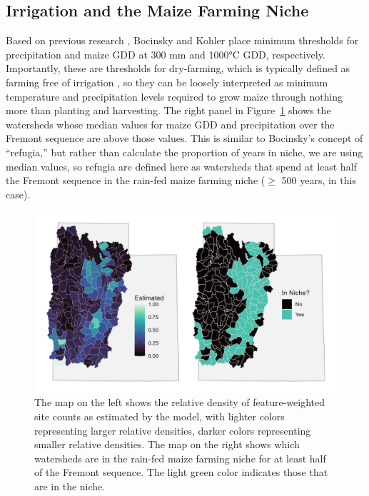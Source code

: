 \documentclass[
  number,
  preprint,
  3p]{elsarticle}
\begin{document}
\hypertarget{irrigation-and-the-maize-farming-niche}{%
\subsection{Irrigation and the Maize Farming
Niche}\label{irrigation-and-the-maize-farming-niche}}

Based on previous research \citep{benson2011, adams2006, bellorado2010},
Bocinsky and Kohler \citep{bocinsky2014} place minimum thresholds for
precipitation and maize GDD at 300 mm and 1000°C GDD, respectively.
Importantly, these are thresholds for dry-farming, which is typically
defined as farming free of irrigation
\citep{benson2011, cordell2012, varien1999}, so they can be loosely
interpreted as minimum temperature and precipitation levels required to
grow maize through nothing more than planting and harvesting. The right
panel in Figure~\ref{fig-thresholds} shows the watersheds whose median
values for maize GDD and precipitation over the Fremont sequence are
above those values. This is similar to Bocinsky's concept of
``refugia,'' but rather than calculate the proportion of years in niche,
we are using median values, so refugia are defined here as watersheds
that spend at least half the Fremont sequence in the rain-fed maize
farming niche (\(\geq\) 500 years, in this case).

\begin{figure}

{\centering \includegraphics[width=6in,height=\textheight]{../figures/threshold_map.png}

}

\caption{\label{fig-thresholds}The map on the left shows the relative
density of feature-weighted site counts as estimated by the model, with
lighter colors representing larger relative densities, darker colors
representing smaller relative densities. The map on the right shows
which watersheds are in the rain-fed maize farming niche for at least
half of the Fremont sequence. The light green color indicates those that
are in the niche.}

\end{figure}
\end{document}
